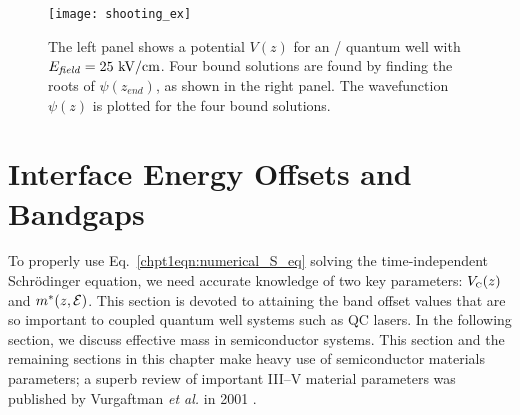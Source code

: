 \documentclass[12pt]{report}
\begin{document}
\begin{figure}[tp]
\centering
\texttt{[image: shooting\_ex]}
\caption[Example use of the shooting method]{  The left panel shows a potential $V(z)$ for an \InGaAs / \AlInAs quantum well with $E_{\textnormal{\textit{field}}}=25~\textnormal{kV/cm}$.  Four bound solutions are found by finding the roots of $\psi(z_{end})$, as shown in the right panel. The wavefunction $\psi(z)$ is plotted for the four bound solutions.}
\label{chpt1:shooting_example}
\end{figure}


\section{Interface Energy Offsets and Bandgaps}

To properly use Eq.~\eqref{chpt1eqn:numerical_S_eq} solving the time-independent Schr\"{o}dinger equation, we need accurate knowledge of two key parameters: $V_{\textnormal{\tiny{C}}}(z)$ and $m^*(z,\EE)$.  This section is devoted to attaining the band offset values that are so important to coupled quantum well systems such as QC lasers.  In the following section, we discuss effective mass in semiconductor systems.  This section and the remaining sections in this chapter make heavy use of semiconductor materials parameters; a superb review of important III--V material parameters was published by Vurgaftman \emph{et al.} in 2001 \cite{Vurgaftman}.
\end{document}
